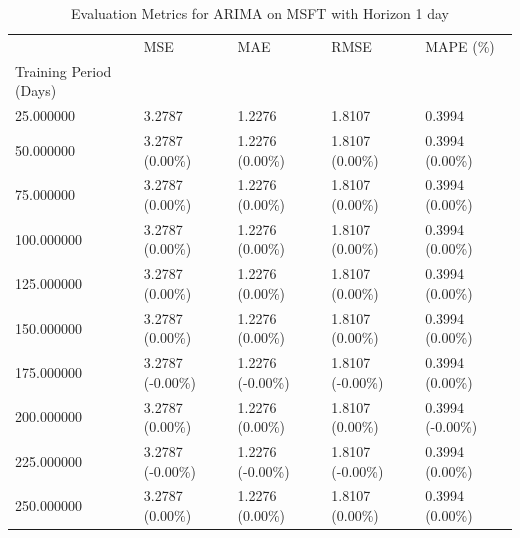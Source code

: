 \begin{table}
\caption{Evaluation Metrics for ARIMA on MSFT with Horizon 1 day}
\label{tab:arima_MSFT_h1_metrics}
\begin{tabular}{lllll}
\toprule
 & MSE & MAE & RMSE & MAPE (\%) \\
Training Period (Days) &  &  &  &  \\
\midrule
25.000000 & 3.2787 & 1.2276 & 1.8107 & 0.3994 \\
50.000000 & 3.2787 (0.00\%) & 1.2276 (0.00\%) & 1.8107 (0.00\%) & 0.3994 (0.00\%) \\
75.000000 & 3.2787 (0.00\%) & 1.2276 (0.00\%) & 1.8107 (0.00\%) & 0.3994 (0.00\%) \\
100.000000 & 3.2787 (0.00\%) & 1.2276 (0.00\%) & 1.8107 (0.00\%) & 0.3994 (0.00\%) \\
125.000000 & 3.2787 (0.00\%) & 1.2276 (0.00\%) & 1.8107 (0.00\%) & 0.3994 (0.00\%) \\
150.000000 & 3.2787 (0.00\%) & 1.2276 (0.00\%) & 1.8107 (0.00\%) & 0.3994 (0.00\%) \\
175.000000 & 3.2787 (-0.00\%) & 1.2276 (-0.00\%) & 1.8107 (-0.00\%) & 0.3994 (0.00\%) \\
200.000000 & 3.2787 (0.00\%) & 1.2276 (0.00\%) & 1.8107 (0.00\%) & 0.3994 (-0.00\%) \\
225.000000 & 3.2787 (-0.00\%) & 1.2276 (-0.00\%) & 1.8107 (-0.00\%) & 0.3994 (0.00\%) \\
250.000000 & 3.2787 (0.00\%) & 1.2276 (0.00\%) & 1.8107 (0.00\%) & 0.3994 (0.00\%) \\
\bottomrule
\end{tabular}
\end{table}
